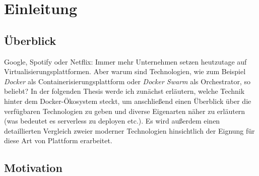 \chapter{Einleitung}

\section{Überblick}

Google, Spotify oder Netflix: Immer mehr Unternehmen setzen heutzutage auf Virtualisierungsplattformen. Aber warum sind Technologien, wie zum Beispiel \emph{Docker} als Containerisierungsplattform oder \emph{Docker Swarm} als Orchestrator, so beliebt? In der folgenden Thesis werde ich zunächst erläutern, welche Technik hinter dem Docker-Ökosystem steckt, um anschließend einen Überblick über die verfügbaren Technologien zu geben und diverse Eigenarten näher zu erläutern (was bedeutet es serverless zu deployen etc.). Es wird außerdem einen detaillierten Vergleich zweier moderner Technologien hinsichtlich der Eignung für diese Art von Plattform erarbeitet.


\section{Motivation}

